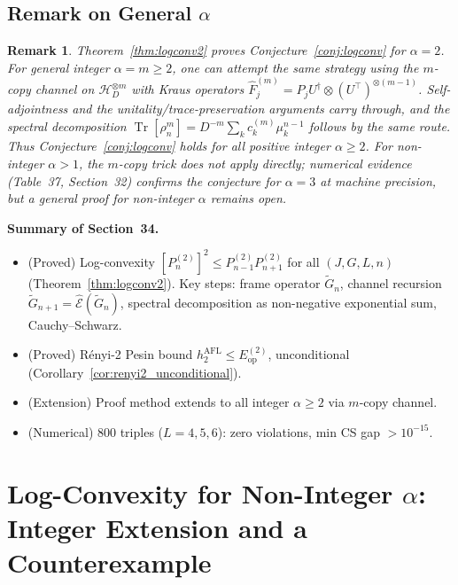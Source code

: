 \documentclass[12pt,a4paper]{article}
\newtheorem{remark}[theorem]{Remark}
\begin{document}
\subsection{Remark on General $\alpha$}
\label{sec:logconv_alpha}

\begin{remark}
Theorem~\ref{thm:logconv2} proves Conjecture~\ref{conj:logconv} for $\alpha=2$.
For general integer $\alpha=m\geq 2$, one can attempt the same strategy using
the $m$-copy channel on $\mathcal{H}_D^{\otimes m}$ with Kraus operators
$\hat{F}_j^{(m)}=P_j U^\dagger\otimes (U^\top)^{\otimes(m-1)}$.
Self-adjointness and the unitality/trace-preservation arguments carry through,
and the spectral decomposition $\operatorname{Tr}[\rho_n^m]=D^{-m}\sum_k c_k^{(m)}\mu_k^{n-1}$
follows by the same route.  Thus Conjecture~\ref{conj:logconv} holds for all
positive integer $\alpha\geq 2$.  For non-integer $\alpha>1$, the $m$-copy trick
does not apply directly; numerical evidence (Table~37, Section~32) confirms
the conjecture for $\alpha=3$ at machine precision, but a general proof for
non-integer $\alpha$ remains open.
\end{remark}

\bigskip
\noindent\textbf{Summary of Section~34.}
\begin{itemize}
\item (Proved) Log-convexity $[P_n^{(2)}]^2\leq P_{n-1}^{(2)}P_{n+1}^{(2)}$ for all $(J,G,L,n)$
  (Theorem~\ref{thm:logconv2}).  Key steps: frame operator $\widetilde{G}_n$, channel recursion
  $\widetilde{G}_{n+1}=\hat{\mathcal{E}}(\widetilde{G}_n)$, spectral decomposition as non-negative
  exponential sum, Cauchy--Schwarz.
\item (Proved) Rényi-2 Pesin bound $h_2^{\mathrm{AFL}}\leq E_{\mathrm{op}}^{(2)}$,
  unconditional (Corollary~\ref{cor:renyi2_unconditional}).
\item (Extension) Proof method extends to all integer $\alpha\geq 2$ via $m$-copy channel.
\item (Numerical) 800 triples ($L=4,5,6$): zero violations, min CS gap $>10^{-15}$.
\end{itemize}

\section{Log-Convexity for Non-Integer $\alpha$: Integer Extension and a Counterexample}
\label{sec:logconv_nonint}
\end{document}

